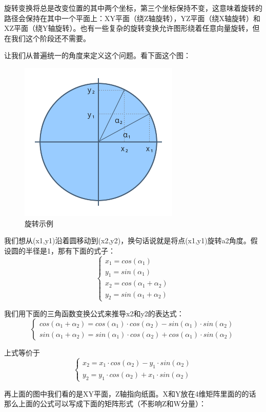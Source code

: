 \documentclass[UTF8,a4paper,12pt]{ctexbook}
\begin{document}
		旋转变换将总是改变位置的其中两个坐标，第三个坐标保持不变，这意味着旋转的路径会保持在其中一个平面上：XY平面（绕Z轴旋转），YZ平面（绕X轴旋转）和XZ平面（绕Y轴旋转）。也有一些复杂的旋转变换允许图形绕着任意向量旋转，但在我们这个阶段还不需要。
		
		让我们从普遍统一的角度来定义这个问题。看下面这个图：
			\begin{figure}[H]
				\centering
				\includegraphics[width=.4\linewidth]{rotate.png}
				\caption{旋转示例}
			\end{figure}
		
		我们想从(x1,y1)沿着圆移动到(x2,y2)，换句话说就是将点(x1,y1)旋转a2角度。假设圆的半径是1，那有下面的式子：
		\begin{equation}
			\begin{cases}
				x_1 = cos(\alpha_1)\\
				y_1 = sin(\alpha_1)\\
				x_2 = cos(\alpha_1 + \alpha_2)\\
				y_2 = sin(\alpha_1 + \alpha_2)
			\end{cases}
		\end{equation}
		
		我们用下面的三角函数变换公式来推导x2和y2的表达式：
		$$
			\begin{cases}
				cos(\alpha_1 + \alpha_2) = cos(\alpha_1)\cdot cos(\alpha_2) - sin(\alpha_1)\cdot sin(\alpha_2)\\
				sin(\alpha_1 + \alpha_2) = sin(\alpha_1)\cdot cos(\alpha_2) + cos(\alpha_1)\cdot sin(\alpha_2)
			\end{cases}
		$$
		
		上式等价于
		$$
		\begin{cases}
			x_2 = x_1\cdot cos(\alpha_2) - y_1\cdot sin(\alpha_2)\\
			y_2 = y_1\cdot cos(\alpha_2) + x_1\cdot sin(\alpha_2)
		\end{cases}
		$$
		
		
		再上面的图中我们看的是XY平面，Z轴指向纸面。X和Y放在4维矩阵里面的的话那么上面的公式可以写成下面的矩阵形式（不影响Z和W分量）：
		
\end{document}
